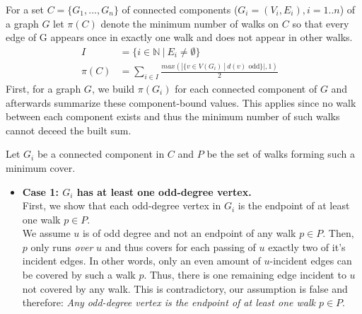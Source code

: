\documentclass[a4paper]{article}
\begin{document}
	\begin{solution}{7}
		\begin{theorem}{
		For a set $C = \{G_1, ..., G_n\}$ of connected components ($G_i = (V_i, E_i), i = 1..n$) of a graph $G$ let $\pi(C)$ denote the minimum number of walks on $C$ so that every edge of G appears once in exactly one walk and does not appear in other walks.\\
		\begin{align}
			I&=\{i \in \mathbb{N}\ |\ E_i \neq \emptyset\}&\\
			\pi(C)&= \sum_{i \in I} \frac{max(|\{v \in V(G_i)\ |\ d(v) \text{ odd}\}|, 1)}{2}&
		\end{align}}			
			First, for a graph $G$, we build $\pi(G_i)$ for each connected component of $G$ and afterwards summarize these component-bound values. This applies since no walk between each component exists and thus the minimum number of such walks cannot deceed the built sum.

			Let $G_i$ be a connected component in $C$ and $P$ be the set of walks forming such a minimum cover.
			
			\begin{itemize}
				\item \textbf{Case 1: $G_i$ has at least one odd-degree vertex.}\\
					First, we show that each odd-degree vertex in $G_i$ is the endpoint of at least one walk $p \in P$.\\

					We assume $u$ is of odd degree and not an endpoint of any walk $p \in P$.
					Then, $p$ only runs \emph{over} $u$ and thus covers  for each passing of $u$ exactly two of it's incident edges.  In other words, only an even amount of $u$-incident edges can be covered by such a walk $p$.
					Thus, there is one remaining edge incident to $u$ not covered by any walk. This is contradictory, our assumption is false and therefore: \emph{Any odd-degree vertex is the endpoint of at least one walk $p \in P$}.\\
			

\end{itemize}
\end{theorem}
\end{solution}
\end{document}
